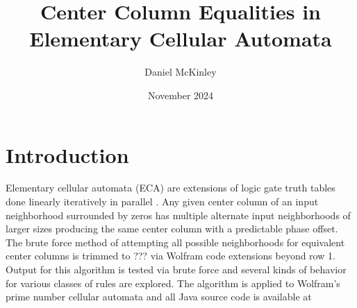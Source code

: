 \documentclass[11pt]{article}
\title{Center Column Equalities in Elementary Cellular Automata}
\date{November 2024}
\author{Daniel McKinley}
\begin{document}
    \maketitle


    \section{Introduction}
    Elementary cellular automata (ECA) are extensions of logic gate truth tables done linearly iteratively
    in parallel \cite{Wolfram}. Any given center column of an input neighborhood surrounded by
    zeros has multiple alternate input neighborhoods of larger sizes producing the same center
    column with a predictable phase offset. The brute force method of attempting all possible
    neighborhoods for equivalent center columns is trimmed to ??? via Wolfram code extensions
    beyond row 1. Output for this algorithm is tested via brute force and several kinds of behavior
    for various classes of rules are explored. The algorithm is applied to Wolfram's prime number
    cellular automata \cite{Wolfram} and all Java source code is available at \cite{mygit}\\
\end{document}
